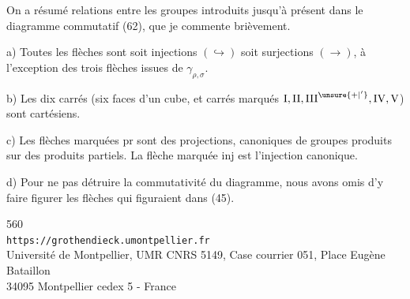 On a résumé 
relations entre les groupes introduits jusqu'à présent dans le diagramme
commutatif (62), que je commente brièvement.

a) Toutes les flèches sont soit injections \((\hookrightarrow)\)
soit surjections \((\longrightarrow)\), à l'exception
 des trois flèches issues de \(\gamma_{\rho,\sigma}\).

b) Les dix carrés (six faces d'un cube, et
 carrés marqués
\(\mathrm I,\mathrm{II},\mathrm{III}^{\unsure{+|'}},
\mathrm{IV},\mathrm V\)) sont cartésiens.

c) Les  flèches marquées \(\mathrm{pr}\)
sont des projections, canoniques de groupes produits sur des produits
partiels. La flèche marquée \(\mathrm{inj}\)
est l'injection canonique.

d) Pour ne pas détruire la commutativité du diagramme,
nous avons omis d'y faire figurer les flèches
qui figuraient dans (45).


{\small
\begin{center}
560\\
\texttt{https://grothendieck.umontpellier.fr}\\
Université de Montpellier, UMR CNRS 5149, Case courrier 051, Place Eugène Bataillon\\
34095 Montpellier cedex 5 - France
\end{center}
}



